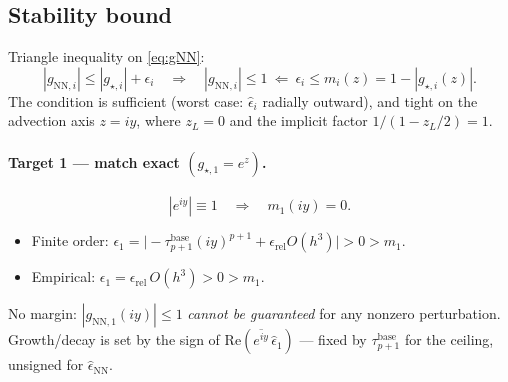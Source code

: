 \documentclass[11pt]{article}
\begin{document}
\subsection{Stability bound}
\label{sec:stab-bound}

Triangle inequality on \eqref{eq:gNN}:
\begin{equation}
  |g_{\mathrm{NN},i}|\le|g_{\star,i}|+\epsilon_i
  \quad\Longrightarrow\quad
  |g_{\mathrm{NN},i}|\le1 \ \Longleftarrow\ \epsilon_i\le m_i(z)=1-|g_{\star,i}(z)|.
  \label{eq:margin}
\end{equation}
The condition is sufficient (worst case: $\hat\epsilon_i$ radially outward), and
tight on the advection axis $z=iy$, where $z_L=0$ and the implicit factor
$1/(1-z_L/2)=1$.

\paragraph{Target 1 --- match exact $(g_{\star,1}=e^{z})$.}
\begin{equation}
  |e^{iy}|\equiv1
  \quad\Longrightarrow\quad
  m_1(iy)=0 .
  \label{eq:m1}
\end{equation}
\begin{itemize}\itemsep0pt
\item Finite order: $\epsilon_1=\big|{-}\tau_{p+1}^{\mathrm{base}}(iy)^{p+1}+\epsilon_{\mathrm{rel}}O(h^3)\big|>0>m_1$.
\item Empirical: $\epsilon_1=\epsilon_{\mathrm{rel}}\,O(h^3)>0>m_1$.
\end{itemize}
No margin: $|g_{\mathrm{NN},1}(iy)|\le1$ \emph{cannot be guaranteed} for any
nonzero perturbation. Growth/decay is set by the sign of
$\mathrm{Re}\!\left(\overline{e^{iy}}\,\hat\epsilon_1\right)$ --- fixed by
$\tau_{p+1}^{\mathrm{base}}$ for the ceiling, unsigned for
$\hat\epsilon_{\mathrm{NN}}$.
\end{document}
